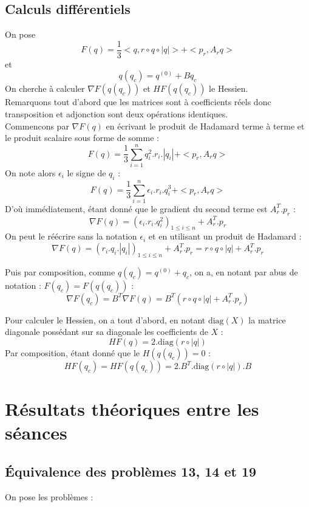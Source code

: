 \documentclass{article}
\begin{document}
    \subsection{Calculs différentiels}
        On pose 
        \[ F(q) = \frac{1}{3}<q, r \circ q \circ |q|> + <p_r, A_rq> \] 
        et 
        \[q(q_c) = q^{(0)} + Bq_c \]
        On cherche à calculer $\nabla F(q(q_c))$ et $H F(q(q_c))$ le Hessien.\\
        Remarquons tout d'abord que les matrices sont à coefficients réels donc transposition et adjonction sont deux opérations identiques.\\
        Commencons par $\nabla F(q)$ en écrivant le produit de Hadamard terme à terme et le produit scalaire sous forme de somme :
        \[ F(q) = \frac{1}{3}\sum_{i = 1}^n q_i^2.r_i.|q_i| + <p_r, A_rq>\]
        On note alors $\epsilon_i$ le signe de $q_i$ :
        \[ F(q) = \frac{1}{3}\sum_{i = 1}^n \epsilon_i.r_i.q_i^3 + <p_r, A_rq>\]
        D'où immédiatement, étant donné que le gradient du second terme est $A_r^T.p_r$ :
        \[\nabla F(q) = (\epsilon_i.r_i.q_i^2)_{1 \leq i \leq n} + A_r^T.p_r\]
        On peut le réécrire sans la notation $\epsilon_i$ et en utilisant un produit de Hadamard : 
        \[ \boxed{\nabla F(q) = (r_i.q_i.|q_i|)_{1 \leq i \leq n} + A_r^T.p_r
            = r\circ q \circ |q| + A_r^T.p_r}\]

        Puis par composition, comme $q(q_c) = q^{(0)} + q_c$, on a, en notant par abus de notation : $F(q_c) = F(q(q_c))$ :
        \[ \boxed{\nabla F(q_c) = B^T\nabla F(q) = B^T(r\circ q \circ |q| + A_r^T.p_r)  
        }\]

        Pour calculer le Hessien, on a tout d'abord, en notant $\text{diag}(X)$ la matrice diagonale possédant sur sa diagonale les coefficients de $X$ :
        \[H F(q) = 2.\text{diag}(r\circ|q|)\]
        Par composition, étant donné que le $H(q(q_c)) = 0$ :
        \[ \boxed{H F(q_c) = H F(q(q_c)) = 2.B^T.\text{diag}(r\circ|q|).B}
        \] 

    \paragraph{}
\section{Résultats théoriques entre les séances}
    \subsection{Équivalence des problèmes 13, 14 et 19}
    On pose les problèmes : 
\end{document}
